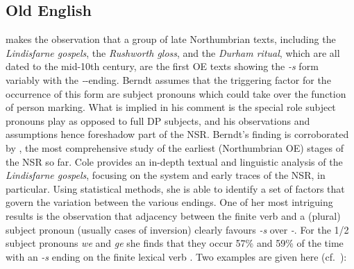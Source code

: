 \documentclass[output=paper]{langsci/langscibook}
\begin{document}
\begin{table}
\caption{Historical development of verbal inflection, Northern
varieties\label{tab:trips:10.2}}
\end{table}

\subsection{Old English}
\label{sec:oe}

\citet{Berndt1956} makes the observation that a group of late Northumbrian
texts, including the \emph{Lindisfarne gospels}, the \emph{Rushworth gloss}, and
the \emph{Durham ritual}, which are all dated to the mid-10th century, are the
first \gls{OE} texts showing the \emph{-s} form variably with the
\emph{-\dh}-ending. Berndt assumes that the triggering factor for the
occurrence of this form are subject pronouns which could take over the function
of person marking. What is implied in his comment is the special role subject
pronouns play as opposed to full DP subjects, and his observations and
assumptions hence foreshadow part of the \gls{NSR}. Berndt's finding is
corroborated by \textcite{Cole2014}, the most comprehensive study of the
earliest (Northumbrian \gls{OE}) stages of the \gls{NSR} so far. Cole provides
an in-depth textual and linguistic analysis of the \emph{Lindisfarne gospels},
focusing on the  system and early traces of the \gls{NSR}, in
particular. Using statistical methods, she is able to identify a set of factors
that govern the variation between the various  endings. One of her
most intriguing results is the observation that adjacency between the finite
verb and a (plural) subject pronoun (usually cases of inversion) clearly
favours \emph{-s} over \emph{-\dh}. For the 1/2\Pl{} subject pronouns \emph{we}
and \emph{ge} she finds that they occur 57\% and 59\% of the time with an
\emph{-s} ending on the finite lexical verb \parencite[112]{Cole2014}. Two
examples are given here (cf.\ \citealt[93]{Cole2014}):
\end{document}
